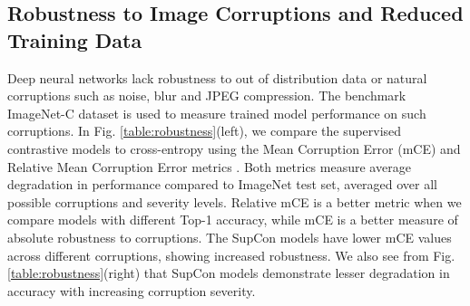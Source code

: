 \subsection{Robustness to Image Corruptions and Reduced Training Data}
Deep neural networks lack robustness to out of distribution data or natural corruptions such as noise, blur and JPEG compression. The benchmark ImageNet-C dataset \cite{hendrycks2019benchmarking} is used to measure trained model performance on such corruptions. In Fig. \ref{table:robustness}(left), we compare the supervised contrastive models to cross-entropy using the Mean Corruption Error (mCE) and Relative Mean Corruption Error metrics \cite{hendrycks2019benchmarking}. Both metrics measure average degradation in performance compared to ImageNet test set, averaged over all possible corruptions and severity levels. Relative mCE is a better metric when we compare models with different Top-1 accuracy, while mCE is a better measure of absolute robustness to corruptions. The SupCon models have lower mCE values across different corruptions, showing increased robustness. We also see from Fig. \ref{table:robustness}(right) that SupCon models demonstrate lesser degradation in accuracy with increasing corruption severity. 


